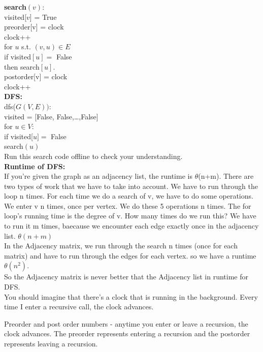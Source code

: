 \documentclass[12pt]{article}   	%
\begin{document}
\noindent
{\bf search}$(v)$:\\
\indent
visited[$v$] = True\\
\indent
preorder[v] = clock\\
\indent
clock++\\
\indent
for $u$ s.t. $(v,u) \in E$\\
\indent
\indent
if visited$[u] =$ False\\
\indent
\indent
then search$[u]$.\\
\indent
postorder[v] = clock\\
\indent
clock++\\

\noindent
{\bf DFS: }\\
dfs($G(V,E))$:\\
\indent
visited =  [False, False,\ldots,False]\\
\indent
for $u \in V$:\\
\indent
\indent
if visited[$u] =$ False\\
\indent
\indent
\indent
search$(u)$\\

\noindent
Run this search code offline to check your understanding.\\

\noindent
{\bf Runtime of DFS:}\\If you're given the graph as an adjacency list, the runtime is $\theta$(n+m). There are two types of work that we have to take into account. We have to run through the loop n times. For each time we do a search of v, we have to do some operations. We enter v n times, once per vertex. We do these 5 operations n times. The for loop's running time is the degree of v. How many times do we run this? We have to run it m times, baecause we encounter each edge exactly once in the adjacency list. $\theta(n+m)$\\

In the Adjacency matrix, we run through the search n times (once for each matrix) and have to run through the edges for each vertex. so we have a runtime $\theta (n^{2})$.\\

So the Adjacency matrix is never better that the Adjacency list in runtime for DFS.\\

\noindent
You should imagine that there's a clock that is running in the background. Every time I enter a recursive call, the clock advances. 

Preorder and post order numbers - anytime you enter or leave a recursion, the clock advances. The preorder represents entering a recursion and the postorder represents leaving a recursion. 
\end{document}
